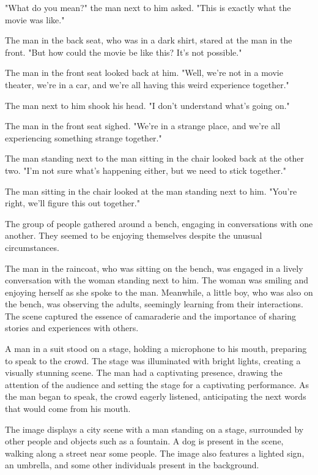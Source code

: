 \documentclass[smalldemyvopaper,11pt,twoside,onecolumn,openright,extrafontsizes]{memoir}
\begin{document}
"What do you mean?" the man next to him asked. "This is exactly what the movie was like."\par
The man in the back seat, who was in a dark shirt, stared at the man in the front. "But how could the movie be like this? It's not possible."\par
The man in the front seat looked back at him. "Well, we're not in a movie theater, we're in a car, and we're all having this weird experience together."\par
The man next to him shook his head. "I don't understand what's going on."\par
The man in the front seat sighed. "We're in a strange place, and we're all experiencing something strange together."\par
The man standing next to the man sitting in the chair looked back at the other two. "I'm not sure what's happening either, but we need to stick together."\par
The man sitting in the chair looked at the man standing next to him. "You're right, we'll figure this out together."\par
The group of people gathered around a bench, engaging in conversations with one another. They seemed to be enjoying themselves despite the unusual circumstances.\par
The man in the raincoat, who was sitting on the bench, was engaged in a lively conversation with the woman standing next to him. The woman was smiling and enjoying herself as she spoke to the man. Meanwhile, a little boy, who was also on the bench, was observing the adults, seemingly learning from their interactions. The scene captured the essence of camaraderie and the importance of sharing stories and experiences with others.\par
A man in a suit stood on a stage, holding a microphone to his mouth, preparing to speak to the crowd. The stage was illuminated with bright lights, creating a visually stunning scene. The man had a captivating presence, drawing the attention of the audience and setting the stage for a captivating performance. As the man began to speak, the crowd eagerly listened, anticipating the next words that would come from his mouth.\par
The image displays a city scene with a man standing on a stage, surrounded by other people and objects such as a fountain. A dog is present in the scene, walking along a street near some people. The image also features a lighted sign, an umbrella, and some other individuals present in the background.\par
\end{document}

